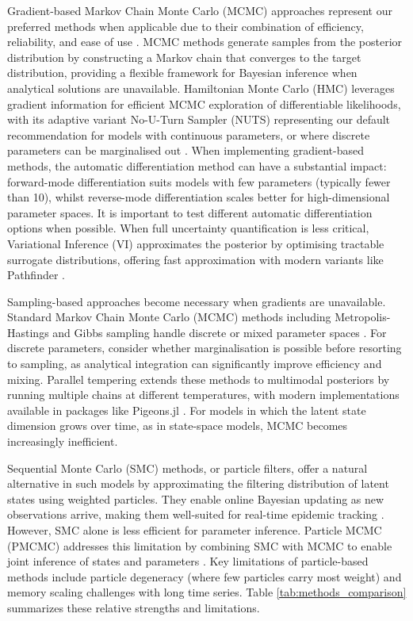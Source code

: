 \documentclass{article}
\begin{document}
Gradient-based Markov Chain Monte Carlo (MCMC) approaches represent our preferred methods when applicable due to their combination of efficiency, reliability, and ease of use \citep{gilks1995markov, lekone2006statistical}.
MCMC methods generate samples from the posterior distribution by constructing a Markov chain that converges to the target distribution, providing a flexible framework for Bayesian inference when analytical solutions are unavailable.
Hamiltonian Monte Carlo (HMC) leverages gradient information for efficient MCMC exploration of differentiable likelihoods, with its adaptive variant No-U-Turn Sampler (NUTS) representing our default recommendation for models with continuous parameters, or where discrete parameters can be marginalised out \citep{duane1987hybrid, hoffman2014no, andrade2020evaluation}.
When implementing gradient-based methods, the automatic differentiation method can have a substantial impact: forward-mode differentiation suits models with few parameters (typically fewer than 10), whilst reverse-mode differentiation scales better for high-dimensional parameter spaces.
It is important to test different automatic differentiation options when possible.
When full uncertainty quantification is less critical, Variational Inference (VI) approximates the posterior by optimising tractable surrogate distributions, offering fast approximation with modern variants like Pathfinder \citep{blei2017variational, chatzilena2019contemporary}.

Sampling-based approaches become necessary when gradients are unavailable.
Standard Markov Chain Monte Carlo (MCMC) methods including Metropolis-Hastings and Gibbs sampling handle discrete or mixed parameter spaces \citep{hastings1970monte, geman1984stochastic, gilks1995markov}.
For discrete parameters, consider whether marginalisation is possible before resorting to sampling, as analytical integration can significantly improve efficiency and mixing.
Parallel tempering extends these methods to multimodal posteriors by running multiple chains at different temperatures, with modern implementations available in packages like Pigeons.jl \citep{surjanovic2023pigeons}.
For models in which the latent state dimension grows over time, as in state-space models, MCMC becomes increasingly inefficient.

Sequential Monte Carlo (SMC) methods, or particle filters, offer a natural alternative in such models by approximating the filtering distribution of latent states using weighted particles. They enable online Bayesian updating as new observations arrive, making them well-suited for real-time epidemic tracking \citep{doucet2001introduction, birrell2020efficient, storvik2023sequential}. However, SMC alone is less efficient for parameter inference. Particle MCMC (PMCMC) addresses this limitation by combining SMC with MCMC to enable joint inference of states and parameters \citep{andrieu2010particle, endo2019introduction}. Key limitations of particle-based methods include particle degeneracy (where few particles carry most weight) and  memory scaling challenges with long time series. Table \ref{tab:methods_comparison} summarizes these relative strengths and limitations.
 
\end{document}
